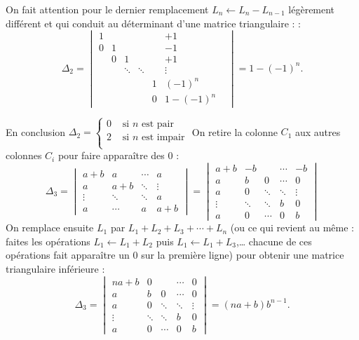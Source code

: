 {{$$$$
On fait attention pour le dernier remplacement $L_n \leftarrow L_n-L_{n-1}$ légèrement différent et qui conduit au déterminant d'une matrice triangulaire : :
$$\Delta_2 = \begin{vmatrix}
  1 &      &    &   &&+1 \\
  0 &1      && &  &-1\\
    & 0      &1  & & &+1\\
    & & \ddots      &\ddots  & &\vdots& \\
   & && &1 & (-1)^{n}\\
  &  &       &&0      &1 - (-1)^{n}                 
               \end{vmatrix}
= 1 - (-1)^{n}.
$$

En conclusion $\Delta_2 = \begin{cases}
                           0 & \text{ si $n$ est pair} \\
                           2 & \text{ si $n$ est impair} \\                           
                          \end{cases}$
On retire la colonne $C_1$ aux autres colonnes $C_i$ pour faire apparaître des $0$ :
$$\Delta_3 = \begin{vmatrix}
    a+b  &    a   & \cdots &  a       \\
     a   &   a+b  & \ddots & \vdots   \\
  \vdots & \ddots & \ddots &  a       \\
     a   & \cdots &    a   & a+b 
\end{vmatrix}
= \begin{vmatrix}
    a+b  &    -b   & & \cdots &  -b       \\
     a   &   b     &   0 & \cdots        &  0   \\
     a   &   0 &  \ddots & \ddots & \vdots   \\
  \vdots & \ddots & \ddots &  b & 0       \\
     a   &  0 & \cdots &    0   & b 
\end{vmatrix}$$
On remplace ensuite $L_1$ par $L_1+L_2+L_3+\cdots +L_n$
(ou ce qui revient au même : faites les opérations 
$L_1 \leftarrow L_1+L_2$ puis $L_1 \leftarrow L_1+L_3$,\ldots
chacune de ces opérations fait apparaître un $0$ sur la première ligne)
pour obtenir une matrice triangulaire inférieure :
$$\Delta_3 = \begin{vmatrix}
   na+b  &    0   & & \cdots &  0       \\
     a   &   b     &   0 & \cdots        &  0   \\
     a   &   0 &  \ddots & \ddots & \vdots   \\
  \vdots & \ddots & \ddots &  b & 0       \\
     a   &  0 & \cdots &    0   & b 
\end{vmatrix}=(na+b)b^{n-1}.$$
}
}
